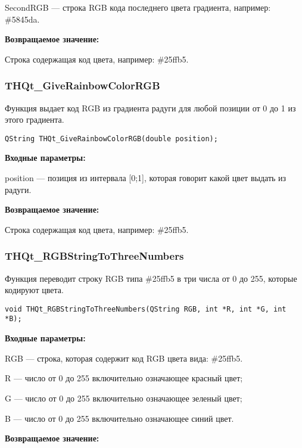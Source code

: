 \documentclass[a4paper,12pt]{article}
\begin{document}
    SecondRGB --- строка RGB кода последнего цвета градиента, например: \#5845da.

\textbf{Возвращаемое значение:}

Строка содержащая код цвета, например: \#25ffb5.


\subsubsection{THQt\_GiveRainbowColorRGB}\label{THQt_GiveRainbowColorRGB}

Функция выдает код RGB из градиента радуги для любой позиции от 0 до 1 из этого градиента.


\begin{lstlisting}[label=code_syntax_THQt_GiveRainbowColorRGB,caption=Синтаксис]
QString THQt_GiveRainbowColorRGB(double position);
\end{lstlisting}

\textbf{Входные параметры:}

position --- позиция из интервала [0;1], которая говорит какой цвет выдать из радуги.

\textbf{Возвращаемое значение:}

Строка содержащая код цвета, например: \#25ffb5.


\subsubsection{THQt\_RGBStringToThreeNumbers}\label{THQt_RGBStringToThreeNumbers}

Функция переводит строку RGB типа \#25ffb5 в три числа от 0 до 255, которые кодируют  цвета.


\begin{lstlisting}[label=code_syntax_THQt_RGBStringToThreeNumbers,caption=Синтаксис]
void THQt_RGBStringToThreeNumbers(QString RGB, int *R, int *G, int *B);
\end{lstlisting}

\textbf{Входные параметры:}

RGB --- строка, которая содержит код RGB цвета вида: \#25ffb5.
 
    R --- число от 0 до 255 включительно означающее красный цвет;
 
    G --- число от 0 до 255 включительно означающее зеленый цвет;
 
    B --- число от 0 до 255 включительно означающее синий цвет.

\textbf{Возвращаемое значение:}
\end{document}
